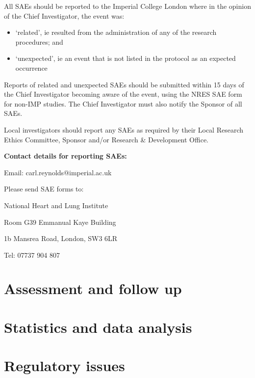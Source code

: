 \documentclass[a4paper,10pt]{article}
\begin{document}
\begin{enumerate}
All SAEs should be reported to the Imperial College London where in the opinion of the Chief Investigator, the event was: \begin{itemize}
                                                                                                                           \item ‘related’, ie resulted from the administration of any of the research procedures; and
					   \item ‘unexpected’, ie an event that is not listed in the protocol as an expected occurrence
                                                                                                                         \end{itemize}

                                                                                                                          
Reports of related and unexpected SAEs should be submitted within 15 days of the Chief Investigator becoming aware of the event, using the NRES SAE form for non-IMP studies. The Chief Investigator must also notify the Sponsor of all SAEs.

Local investigators should report any SAEs as required by their Local Research Ethics Committee, Sponsor and/or Research \& Development Office.

\begin{center}
\textbf{Contact details for reporting SAEs:}
 
Email: carl.reynolds@imperial.ac.uk

Please send SAE forms to: 

National Heart and Lung Institute

Room G39 Emmanual Kaye Building

1b Mansrea Road, London, SW3 6LR 

Tel: 07737 904 807

\end{center}


\section{Assessment and follow up}


\section{Statistics and data analysis}



\section{Regulatory issues}


\end{enumerate}
\end{document}
